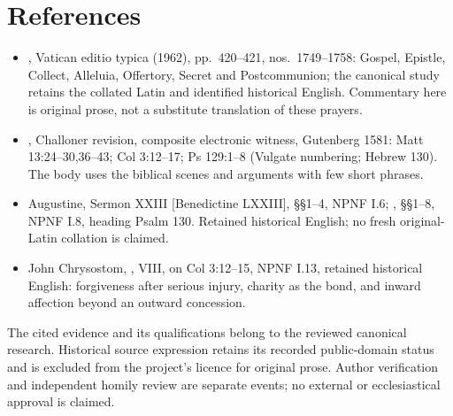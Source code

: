 \section{References}
\begin{itemize}
\item {}, Vatican editio typica (1962),
pp.~420--421, nos.~1749--1758: Gospel, Epistle, Collect, Alleluia,
Offertory, Secret and Postcommunion; the canonical study retains the
collated Latin and identified historical English. Commentary here is
original prose, not a substitute translation of these prayers.
\item {}, Challoner revision, composite
electronic witness, Gutenberg 1581: Matt 13:24--30,36--43;
Col 3:12--17; Ps 129:1--8 (Vulgate numbering; Hebrew 130).
The body uses the biblical scenes and arguments with few short phrases.
\item Augustine, Sermon XXIII [Benedictine LXXIII], §§1--4,
NPNF I.6; , §§1--8,
NPNF I.8, heading Psalm 130. Retained historical English;
no fresh original-Latin collation is claimed.
\item John Chrysostom, , VIII,
on Col 3:12--15, NPNF I.13, retained historical English:
forgiveness after serious injury, charity as the bond, and inward
affection beyond an outward concession.
\end{itemize}
The cited evidence and its qualifications belong to the reviewed canonical
research. Historical source expression retains its recorded public-domain
status and is excluded from the project's licence for original prose.
Author verification and independent homily review are separate events;
no external or ecclesiastical approval is claimed.
